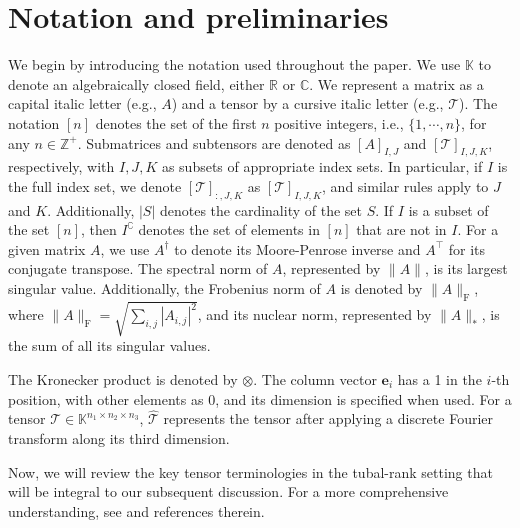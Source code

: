 \documentclass[twoside,12pt]{article}
\def\fro{{\mathrm{F}}}
\def\fro{{\mathrm{F}}}
\begin{document}
\section{Notation and preliminaries}
\vspace{-1mm}
 We begin by introducing  the notation  used throughout the paper. We use $\mathbb{K}$  to denote an algebraically closed field,  either $\mathbb{R}$ or $\mathbb{C}$. We represent a matrix as a capital italic letter (e.g., $A$) and a tensor by a cursive italic letter (e.g., $\mathcal{T}$). The notation $[n]$ denotes the set of the first $n$ positive integers, i.e., $\{1, \cdots, n\}$, for any $n \in \mathbb{Z}^{+}$. Submatrices and subtensors are denoted as $[A]_{I,J}$ and $[\mathcal{T}]_{I,J,K}$, respectively, with $I,J,K$ as subsets of appropriate index sets. In particular, if $I$ is the full index set, we denote $[\mathcal{T}]_{:,J,K}$ as $[\mathcal{T}]_{I,J,K}$, and similar rules apply to $J$ and $K$.  
  Additionally, $|S|$ denotes the cardinality of the set $S$. If \( I \) is a subset of the set \( [n] \), then \( I^{\complement} \) denotes the set of elements in \( [n] \) that are not in \( I \). For a given matrix \(A\), we use \(A^{\dagger}\) to denote its Moore-Penrose inverse and \(A^{\top}\) for its conjugate transpose. The spectral norm of \(A\), represented by \(\|A\|\), is its largest singular value. Additionally, the Frobenius norm of \(A\) is denoted by \(\|A\|_{\fro}\), where \(\|A\|_{\fro} = \sqrt{\sum_{i,j} |A_{i,j}|^2}\), and its nuclear norm, represented by \(\|A\|_{*}\), is the sum of all its singular values.
  
  The Kronecker product is denoted by \(\otimes\). The column vector \(\mathbf{e}_i\) has a 1 in the \(i\)-th position, with other elements as 0, and its dimension is specified when used. %
  For a tensor \(\mathcal{T}\in \mathbb{K}^{n_1\times n_2\times n_3}\), \(\widehat{\mathcal{T}}\) represents the tensor after applying a discrete Fourier transform along its third dimension.

Now, we will review the key tensor terminologies {in the tubal-rank setting} that will be integral to our subsequent discussion.  For a more comprehensive understanding,   see \citep{kilmer2011factorization,KBHH2013} and references therein.
\end{document}
